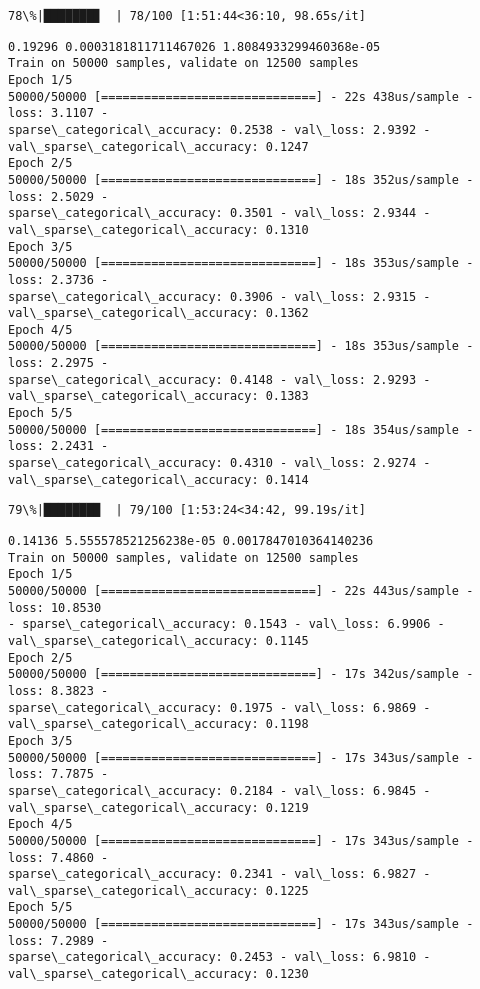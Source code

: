 \documentclass[11pt]{article}
\begin{document}
    \begin{Verbatim}[commandchars=\\\{\}]
 78\%|███████▊  | 78/100 [1:51:44<36:10, 98.65s/it]
    \end{Verbatim}

    \begin{Verbatim}[commandchars=\\\{\}]
0.19296 0.0003181811711467026 1.8084933299460368e-05
Train on 50000 samples, validate on 12500 samples
Epoch 1/5
50000/50000 [==============================] - 22s 438us/sample - loss: 3.1107 -
sparse\_categorical\_accuracy: 0.2538 - val\_loss: 2.9392 -
val\_sparse\_categorical\_accuracy: 0.1247
Epoch 2/5
50000/50000 [==============================] - 18s 352us/sample - loss: 2.5029 -
sparse\_categorical\_accuracy: 0.3501 - val\_loss: 2.9344 -
val\_sparse\_categorical\_accuracy: 0.1310
Epoch 3/5
50000/50000 [==============================] - 18s 353us/sample - loss: 2.3736 -
sparse\_categorical\_accuracy: 0.3906 - val\_loss: 2.9315 -
val\_sparse\_categorical\_accuracy: 0.1362
Epoch 4/5
50000/50000 [==============================] - 18s 353us/sample - loss: 2.2975 -
sparse\_categorical\_accuracy: 0.4148 - val\_loss: 2.9293 -
val\_sparse\_categorical\_accuracy: 0.1383
Epoch 5/5
50000/50000 [==============================] - 18s 354us/sample - loss: 2.2431 -
sparse\_categorical\_accuracy: 0.4310 - val\_loss: 2.9274 -
val\_sparse\_categorical\_accuracy: 0.1414
    \end{Verbatim}

    \begin{Verbatim}[commandchars=\\\{\}]
 79\%|███████▉  | 79/100 [1:53:24<34:42, 99.19s/it]
    \end{Verbatim}

    \begin{Verbatim}[commandchars=\\\{\}]
0.14136 5.555578521256238e-05 0.0017847010364140236
Train on 50000 samples, validate on 12500 samples
Epoch 1/5
50000/50000 [==============================] - 22s 443us/sample - loss: 10.8530
- sparse\_categorical\_accuracy: 0.1543 - val\_loss: 6.9906 -
val\_sparse\_categorical\_accuracy: 0.1145
Epoch 2/5
50000/50000 [==============================] - 17s 342us/sample - loss: 8.3823 -
sparse\_categorical\_accuracy: 0.1975 - val\_loss: 6.9869 -
val\_sparse\_categorical\_accuracy: 0.1198
Epoch 3/5
50000/50000 [==============================] - 17s 343us/sample - loss: 7.7875 -
sparse\_categorical\_accuracy: 0.2184 - val\_loss: 6.9845 -
val\_sparse\_categorical\_accuracy: 0.1219
Epoch 4/5
50000/50000 [==============================] - 17s 343us/sample - loss: 7.4860 -
sparse\_categorical\_accuracy: 0.2341 - val\_loss: 6.9827 -
val\_sparse\_categorical\_accuracy: 0.1225
Epoch 5/5
50000/50000 [==============================] - 17s 343us/sample - loss: 7.2989 -
sparse\_categorical\_accuracy: 0.2453 - val\_loss: 6.9810 -
val\_sparse\_categorical\_accuracy: 0.1230
    \end{Verbatim}
\end{document}
